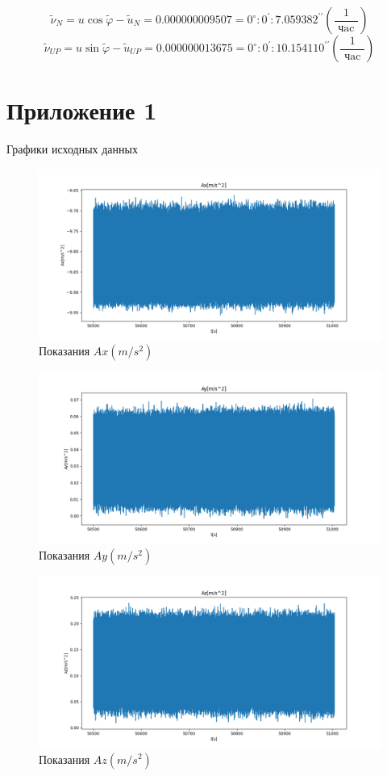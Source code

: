 \documentclass[a4paper,14pt]{article}
\theoremstyle{plain} %
\theoremstyle{definition} %
\theoremstyle{remark} %
\begin{document}
{$$
    \widetilde{\nu}_{N}=u \cos \widetilde{\varphi}-\widetilde{u}_{N}=0.000000009507=0^{\circ}: 0^{\prime}: 7.059382^{\prime \prime}\left(\frac{1}{\text { чac }}\right)
$$
$$
    \widetilde{\nu}_{U P}=u \sin \widetilde{\varphi}-\widetilde{u}_{U P}=0.000000013675=0^{\circ}: 0^{\prime}: 10.154110^{\prime \prime}\left(\frac{1}{\text { чac }}\right)
$$

\section{Приложение 1}
Графики исходных данных

\begin{figure}[h!]
    \centering
    \includegraphics[width=0.99\linewidth]{Ax.png}
    \caption{Показания $Ax(m/s^2)$}
    \label{fig:ax}
\end{figure}

\begin{figure}[h!]
    \centering
    \includegraphics[width=0.99\linewidth]{Ay.png}
    \caption{Показания $Ay(m/s^2)$}
    \label{fig:ay}
\end{figure}

\begin{figure}[h!]
    \centering
    \includegraphics[width=0.99\linewidth]{Az.png}
    \caption{Показания $Az(m/s^2)$}
    \label{fig:az}
\end{figure}

}
\end{document}
